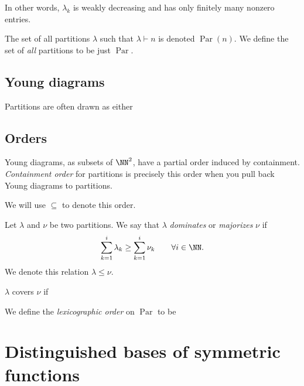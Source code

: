 \documentclass{article}
\DeclareMathOperator{\Par}{Par}
\begin{document}
In other words, $\lambda_k$ is weakly decreasing and has only finitely many nonzero entries. 

The set of all partitions $\lambda$ such that $\lambda \vdash n$ is denoted $\Par(n)$. We define the set of \textit{all} partitions to be just $\Par$.

\subsection{Young diagrams}
Partitions are often drawn as either 

\subsection{Orders}

\begin{definition}
    Young diagrams, as subsets of $\NN^2$, have a partial order induced by containment. 
    \textit{Containment order} for partitions is precisely this order when you pull back Young diagrams to partitions.

    We will use $\subseteq$ to denote this order.
\end{definition}

\begin{definition}
    Let $\lambda$ and $\nu$ be two partitions. We say that $\lambda$ \textit{dominates} or \textit{majorizes} $\nu$ if
    \[
        \sum_{k=1}^i \lambda_k \geq \sum_{k=1}^i \nu_k \qquad \forall i\in\NN.
    \]
    We denote this relation $\lambda \leq \nu$.
\end{definition}

\begin{theorem}
    $\lambda$ covers $\nu$ if
\end{theorem}

\begin{definition}
    We define the \textit{lexicographic order} on $\Par$ to be
\end{definition}

\begin{theorem}
\end{theorem}

\begin{theorem}
\end{theorem}

\section{Distinguished bases of symmetric functions}
\end{document}

